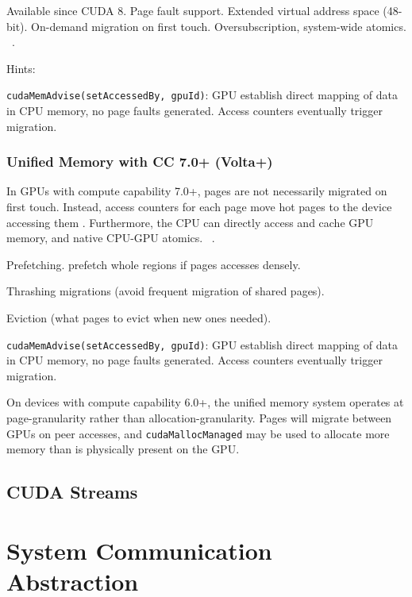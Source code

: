 Available since CUDA 8.
Page fault support.
Extended virtual address space (48-bit).
On-demand migration on first touch.
Oversubscription, system-wide atomics.
~\cite{sakharnykh2017unified}.

Hints:

\texttt{cudaMemAdvise(setAccessedBy, gpuId)}: GPU establish direct mapping of data in CPU memory, no page faults generated.
Access counters eventually trigger migration.

\subsubsection {Unified Memory with CC 7.0+ (Volta+) }

In GPUs with compute capability 7.0+, pages are not necessarily migrated on first touch.
Instead, access counters for each page move hot pages to the device accessing them .
Furthermore, the CPU can directly access and cache GPU memory, and native CPU-GPU atomics. ~\cite{sakharnykh2017unified}.


Prefetching.
prefetch whole regions if pages accesses densely.

Thrashing migrations (avoid frequent migration of shared pages).

Eviction (what pages to evict when new ones needed).

\texttt{cudaMemAdvise(setAccessedBy, gpuId)}: GPU establish direct mapping of data in CPU memory, no page faults generated.
Access counters eventually trigger migration.





On devices with compute capability 6.0+, the unified memory system operates at page-granularity rather than allocation-granularity.
Pages will migrate between GPUs on peer accesses, and \texttt{cudaMallocManaged} may be used to allocate more memory than is physically present on the GPU.

\subsection{CUDA Streams}




\section{System Communication Abstraction}
\label{sec:sys-abstraction}

